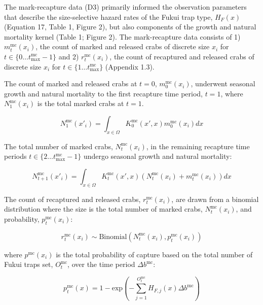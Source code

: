 \documentclass{article}
\begin{document}
The mark-recapture data (D3) primarily informed the observation parameters that describe the size-selective hazard rates of the Fukui trap type, $H_F(x)$ (Equation 17, Table 1, Figure 2), but also components of the growth and natural mortality kernel (Table 1; Figure 2). The mark-recapture data consists of 1) $m_t^{\text{mc}}(x_i)$, the count of marked and released crabs of discrete size $x_i$ for $t \in \{0 \ldots t^\text{mc}_\text{max} - 1\}$ and 2) $r_t^{\text{mc}}(x_i)$, the count of recaptured and released crabs of discrete size $x_i$ for $t \in \{1 \ldots t^\text{mc}_\text{max}\}$ (Appendix 1.3). 

The count of marked and released crabs at $t = 0$, $m_0^{\text{mc}}(x_i)$, underwent seasonal growth and natural mortality to the first recapture time period, $t = 1$, where $N_1^{\text{mc}}(x_i)$ is the total marked crabs at $t = 1$.

\begin{equation}
N_1^{\text{mc}}(x'_i) = \int_{x \in \Omega} K_0^{\text{mc}}(x',x) m_0^{\text{mc}}(x_i)dx
\end{equation}

The total number of marked crabs, $N_t^{\text{mc}}(x_i)$, in the remaining recapture time periods $t \in \{2 \ldots t^\text{mc}_\text{max} - 1\}$ undergo seasonal growth and natural mortality:

\begin{equation}
N_{t+1}^{\text{mc}}(x'_i) = \int_{x \in \Omega} K_t^{\text{mc}}(x',x) (N_t^{\text{mc}}(x_i) + m_t^{\text{mc}}(x_i))dx
\end{equation}

The count of recaptured and released crabs, $r_t^{\text{mc}}(x_i)$, are drawn from a binomial distribution where the size is the total number of marked crabs, $N_t^{\text{mc}}(x_i)$, and probability, $p_t^{\text{mc}}(x_i)$:

\begin{equation}
r_t^{\text{mc}}(x_i) \sim \text{Binomial}(N_t^{\text{mc}}(x_i), p_t^{\text{mc}}(x_i)) 
\end{equation}

where $p^{\text{mc}}(x_i)$ is the total probability of capture based on the total number of Fukui traps set, $O_t^{\text{mc}}$, over the time period $\Delta b^{\text{mc}}$:

\begin{equation}
p_t^{\text{mc}}(x) = 1-\text{exp}\left(-\sum_{j=1}^{O_t^{\text{mc}}} H_{F,j}(x)\Delta b^{\text{mc}}\right)
\end{equation}
\end{document}
